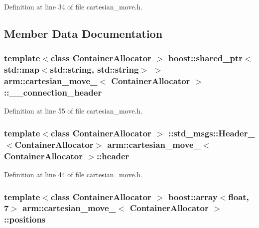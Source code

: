 \-Definition at line 34 of file cartesian\-\_\-move.\-h.



\subsection{\-Member \-Data \-Documentation}
\subsubsection[{\-\_\-\-\_\-connection\-\_\-header}]{\setlength{\rightskip}{0pt plus 5cm}template$<$class Container\-Allocator $>$ boost\-::shared\-\_\-ptr$<$std\-::map$<$std\-::string, std\-::string$>$ $>$ {\bf arm\-::cartesian\-\_\-move\-\_\-}$<$ \-Container\-Allocator $>$\-::{\bf \-\_\-\-\_\-connection\-\_\-header}}\label{structarm_1_1cartesian__move___aeb747a1e1ff6b6f81678ac8be4204d31}


\-Definition at line 55 of file cartesian\-\_\-move.\-h.

\subsubsection[{header}]{\setlength{\rightskip}{0pt plus 5cm}template$<$class Container\-Allocator $>$ \-::std\-\_\-msgs\-::\-Header\-\_\-$<$\-Container\-Allocator$>$ {\bf arm\-::cartesian\-\_\-move\-\_\-}$<$ \-Container\-Allocator $>$\-::{\bf header}}\label{structarm_1_1cartesian__move___ad96e938f8182c6ffa03748c95683e00e}


\-Definition at line 44 of file cartesian\-\_\-move.\-h.

\subsubsection[{positions}]{\setlength{\rightskip}{0pt plus 5cm}template$<$class Container\-Allocator $>$ boost\-::array$<$float, 7$>$ {\bf arm\-::cartesian\-\_\-move\-\_\-}$<$ \-Container\-Allocator $>$\-::{\bf positions}}\label{structarm_1_1cartesian__move___a258001b0fe9c76e1d243495882ee3043}


